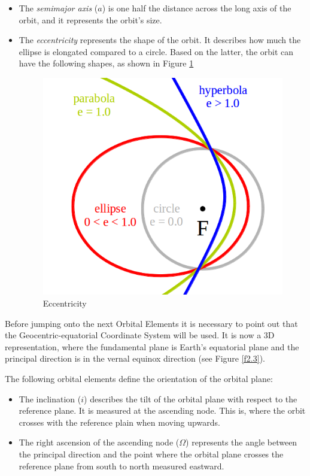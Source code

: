 \begin{itemize}
\item The \emph{semimajor axis} ($a$) is one half the distance across the long axis of the orbit, and it represents the orbit's size.
\item The \emph{eccentricity} represents the shape of the orbit. It describes how much the ellipse is elongated compared to a circle. Based on the latter, the orbit can have the following shapes, as shown in Figure \ref{f2.2}

\begin{figure}[H]
\centerline{\includegraphics[scale=0.35]{images/Eccentricity.png}}
\caption{Eccentricity}
\label{f2.2}
\end{figure}

\end{itemize}


Before jumping onto the next Orbital Elements it is necessary to point out that the Geocentric-equatorial Coordinate System will be used. It is now a 3D representation, where the fundamental plane is Earth's equatorial plane and the principal direction is in the vernal equinox direction (see Figure \ref{f2.3}).

The following orbital elements define the orientation of the orbital plane:

\begin{itemize}
\item The inclination ($i$) describes the tilt of the orbital plane with respect to the reference plane. It is measured at the ascending node. This is, where the orbit crosses with the reference plain when moving upwards.
\item The right ascension of the ascending node ($\Omega$) represents the angle between the principal direction and the point where the orbital plane crosses the reference plane from south to north measured eastward. 
\end{itemize}

